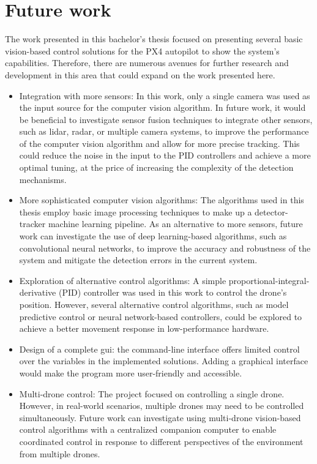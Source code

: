 \section{Future work}
\label{sec:fut-work}

The work presented in this bachelor's thesis focused on presenting several basic vision-based control solutions for the PX4 autopilot to show the system's capabilities. Therefore, there are numerous avenues for further research and development in this area that could expand on the work presented here.

\begin{itemize}
    \item Integration with more sensors: In this work, only a single camera was used as the input source for the computer vision algorithm. In future work, it would be beneficial to investigate sensor fusion techniques to integrate other sensors, such as lidar, radar, or multiple camera systems, to improve the performance of the computer vision algorithm and allow for more precise tracking. This could reduce the noise in the input to the PID controllers and achieve a more optimal tuning, at the price of increasing the complexity of the detection mechanisms.

    \item More sophisticated computer vision algorithms: The algorithms used in this thesis employ basic image processing techniques to make up a detector-tracker machine learning pipeline. As an alternative to more sensors, future work can investigate the use of deep learning-based algorithms, such as convolutional neural networks, to improve the accuracy and robustness of the system and mitigate the detection errors in the current system.

    \item Exploration of alternative control algorithms: A simple proportional-integral-derivative (PID) controller was used in this work to control the drone's position. However, several alternative control algorithms, such as model predictive control or neural network-based controllers, could be explored to achieve a better movement response in low-performance hardware.

    \item Design of a complete \acrlong{gui}: the command-line interface offers limited control over the variables in the implemented solutions. Adding a graphical interface would make the program more user-friendly and accessible.

    \item Multi-drone control: The project focused on controlling a single drone. However, in real-world scenarios, multiple drones may need to be controlled simultaneously. Future work can investigate using multi-drone vision-based control algorithms with a centralized companion computer to enable coordinated control in response to different perspectives of the environment from multiple drones.


\end{itemize}

